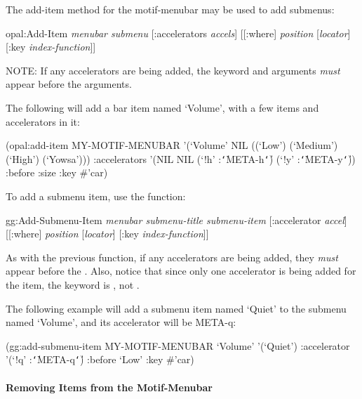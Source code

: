 The add-item method for the motif-menubar may be used to add submenus:

\begin{programexample}
opal:Add-Item {\it menubar submenu} [:accelerators {\it accels}] \value{method}
              {\it                               } [[:where] {\it position} [{\it locator}] [:key {\it index-function}]]
\end{programexample}

NOTE: If any accelerators are being added, the  keyword and
arguments {\it must} appear before the  arguments.

The following will add a bar item named `Volume', with a few items and
accelerators in it:

\begin{programexample}
(opal:add-item MY-MOTIF-MENUBAR
	       '(`Volume' NIL ((`Low') (`Medium') (`High') (`Yowsa')))
	       :accelerators '(NIL NIL
			       (`!h' :{\tt\char`\|}META-h{\tt\char`\|}) (`!y' :{\tt\char`\|}META-y{\tt\char`\|}))
	       :before :size :key \#'car)
\end{programexample}

To add a submenu item, use the function:

\begin{programexample}
gg:Add-Submenu-Item {\it menubar submenu-title submenu-item} \value{method}
                    [:accelerator {\it accel}]
                    [[:where] {\it position} [{\it locator}] [:key {\it index-function}]]
\end{programexample}

As with the previous function, if any accelerators are being added, they
{\it must} appear before the .  Also, notice that since only one
accelerator is being added for the item, the keyword is , not
.

The following example will add a submenu item named `Quiet' to the
submenu named `Volume', and its accelerator will be META-q:

\begin{programexample}
(gg:add-submenu-item MY-MOTIF-MENUBAR `Volume' '(`Quiet')
		     :accelerator '(`!q' :{\tt\char`\|}META-q{\tt\char`\|}) :before `Low' :key \#'car)
\end{programexample}



\paragraph{Removing Items from the Motif-Menubar}

